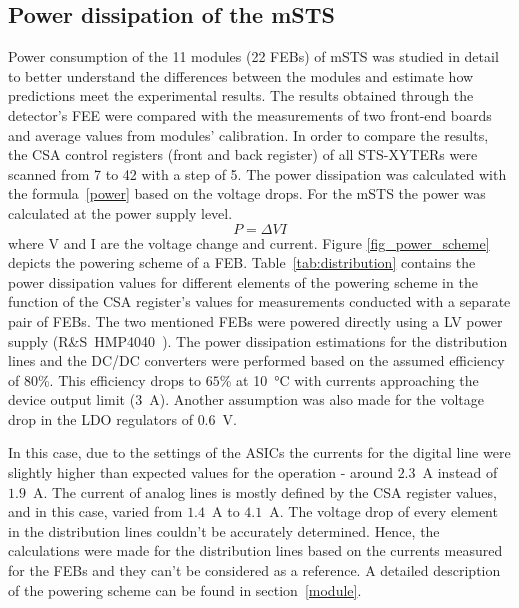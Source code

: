 \subsection{Power dissipation of the mSTS}
 Power consumption of the 11 modules (22 \glspl{FEB}) of \gls{mSTS} was studied in detail to better understand the differences between the modules and estimate how predictions meet the experimental results. The results obtained through the detector's \gls{FEE} were compared with the measurements of two front-end boards and average values from modules' calibration. In order to compare the results, the \gls{CSA} control registers (front and back register) of all STS-XYTERs were scanned from 7 to 42 with a step of 5. The power dissipation was calculated with the formula~\ref{power} based on the voltage drops. For the \gls{mSTS} the power was calculated at the power supply level.
  \begin{equation}
  \label{power}
    P = \Delta VI
\end{equation}
where V and I are the voltage change and current. Figure \ref{fig_power_scheme} depicts the powering scheme of a \gls{FEB}. Table~\ref{tab:distribution} contains the power dissipation values for different elements of the powering scheme in the function of the \gls{CSA} register's values for measurements conducted with a separate pair of \glspl{FEB}. The two mentioned \glspl{FEB} were powered directly using a \gls{LV} power supply (R\&S~HMP4040~\cite{RS}). The power dissipation estimations for the distribution lines and the DC/DC converters were performed based on the assumed efficiency of $80$\%. This efficiency drops to $65$\% at \SI{10}{\celsius} with currents approaching the device output limit ($3$~A).  Another assumption was also made for the voltage drop in the \gls{LDO} regulators of $0.6$~V.
 
 In this case, due to the settings of the \glspl{ASIC} the currents for the digital line were slightly higher than expected values for the operation - around $2.3$~A instead of $1.9$~A. The current of analog lines is mostly defined by the \gls{CSA} register values, and in this case, varied from $1.4$~A to $4.1$~A.  The voltage drop of every element in the distribution lines couldn't be accurately determined. Hence, the calculations were made for the distribution lines based on the currents measured for the \glspl{FEB} and they can't be considered as a reference. A detailed description of the powering scheme can be found in section~\ref{module}.


